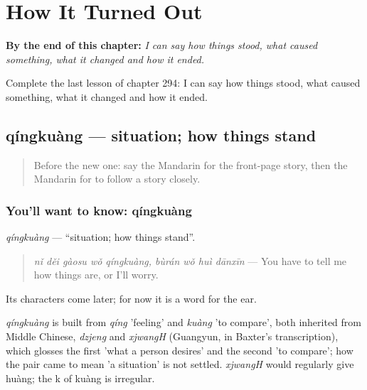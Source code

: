 
\chapter{How It Turned Out}
\label{ch:zh-how-it-turned-out}

\begin{chapteropening}
\textbf{By the end of this chapter:} \emph{I can say how things stood, what caused something, what it changed and how it ended.}

Complete the last lesson of chapter 294: I can say how things stood, what caused something, what it changed and how it ended.
\end{chapteropening}

\section[qíngkuàng]{qíngkuàng — situation; how things stand}

\label{lesson:ZH-C294-qingkuang}



\begin{quote}
Before the new one: say the Mandarin for the front-page story, then the Mandarin for to follow a story closely.
\end{quote}

\subsection*{You'll want to know: qíngkuàng}
\emph{qíngkuàng} — \textquotedblleft{}situation; how things stand\textquotedblright{}.

\begin{quote}
\emph{nǐ děi gàosu wǒ qíngkuàng, bùrán wǒ huì dānxīn} — You have to tell me how things are, or I'll worry.
\end{quote}

Its characters come later; for now it is a word for the ear.

\begin{cousinweb}
\emph{qíngkuàng} is built from \emph{qíng} 'feeling' and \emph{kuàng} 'to compare', both inherited from Middle Chinese, \emph{dzjeng} and \emph{xjwangH} (Guangyun, in Baxter's transcription), which glosses the first 'what a person desires' and the second 'to compare'; how the pair came to mean 'a situation' is not settled. \emph{xjwangH} would regularly give huàng; the k of kuàng is irregular.
\end{cousinweb}

